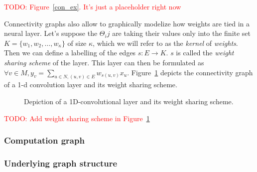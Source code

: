 \documentclass{article}
\theoremstyle{definition}
\newcommand{\todo}[1]{\textcolor{red}{TODO: #1\\}}
\begin{document}
\todo{Figure~\ref{con_ex}. It's just a placeholder right now}


Connectivity graphs also allow to graphically modelize how weights are tied in a neural layer. Let's suppose the $\Theta_ij$ are taking their values only into the finite set $K = \{w_1, w_2, \ldots, w_\kappa\}$ of size $\kappa$, which we will refer to as the \emph{kernel} of \emph{weights}. Then we can define a labelling of the edges $s: E \rightarrow K$. $s$ is called the \emph{weight sharing scheme} of the layer. This layer can then be formulated as $\displaystyle \forall v \in M, y_v = \sum_{u \in N, (u,v) \in E} w_{s(u,v)} x_u$. Figure~\ref{cnn} depicts the connectivity graph of a 1-d convolution layer and its weight sharing scheme.

\begin{figure}[h]
  \begin{center}
  \end{center}
  \caption{Depiction of a 1D-convolutional layer and its weight sharing scheme.}
  \label{cnn}
\end{figure}


\todo{Add weight sharing scheme in Figure~\ref{cnn}}

\subsubsection{Computation graph}
\label{comp_graph}

\subsubsection{Underlying graph structure}
\label{inductive_graph}
\end{document}
